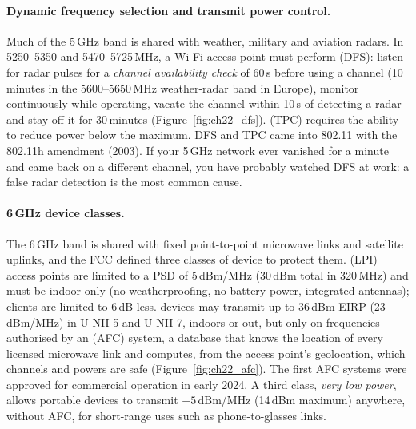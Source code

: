 \paragraph{Dynamic frequency selection and transmit power control.} Much of the 5\,GHz band is
shared with weather, military and aviation radars. In 5250--5350 and 5470--5725\,MHz, a Wi-Fi
access point must perform  (DFS): listen for radar pulses for a
\emph{channel availability check} of 60\,s before using a channel (10\,minutes in the
5600--5650\,MHz weather-radar band in Europe), monitor continuously while operating, vacate the
channel within 10\,s of detecting a radar and stay off it for 30\,minutes
(Figure~\ref{fig:ch22_dfs}).  (TPC) requires the ability to reduce
power below the maximum. DFS and TPC came into 802.11 with the 802.11h amendment (2003). If your
5\,GHz network ever vanished for a minute and came back on a different channel, you have probably
watched DFS at work: a false radar detection is the most common cause.


\paragraph{6\,GHz device classes.} The 6\,GHz band is shared with fixed point-to-point microwave
links and satellite uplinks, and the FCC defined three classes of device to protect them.
 (LPI) access points are limited to a PSD of 5\,dBm/MHz (30\,dBm total in
320\,MHz) and must be indoor-only (no weatherproofing, no battery power, integrated antennas);
clients are limited to 6\,dB less.  devices may transmit up to 36\,dBm EIRP
(23\,dBm/MHz) in U-NII-5 and U-NII-7, indoors or out, but only on frequencies authorised by an
 (AFC) system, a database that knows the location of every
licensed microwave link and computes, from the access point's geolocation, which channels and
powers are safe (Figure~\ref{fig:ch22_afc}). The first AFC systems were approved for commercial
operation in early 2024. A third class, \emph{very low power}, allows portable devices to transmit
$-5$\,dBm/MHz (14\,dBm maximum) anywhere, without AFC, for short-range uses such as phone-to-glasses
links.

